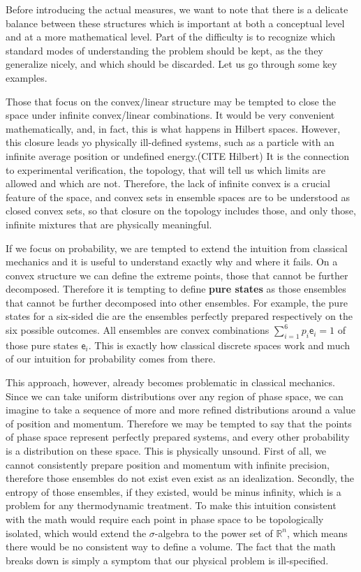 \documentclass[10pt,twocolumn, nofootinbib]{revtex4-2}
\newcommand{\ens}[1][e] {\mathsf{#1}} %
\begin{document}
Before introducing the actual measures, we want to note that there is a delicate balance between these structures which is important at both a conceptual level and at a more mathematical level. Part of the difficulty is to recognize which standard modes of understanding the problem should be kept, as the they generalize nicely, and which should be discarded. Let us go through some key examples.

Those that focus on the convex/linear structure may be tempted to close the space under infinite convex/linear combinations. It would be very convenient mathematically, and, in fact, this is what happens in Hilbert spaces. However, this closure leads yo physically ill-defined systems, such as a particle with an infinite average position or undefined energy.(CITE Hilbert) It is the connection to experimental verification, the topology, that will tell us which limits are allowed and which are not. Therefore, the lack of infinite convex is a crucial feature of the space, and convex sets in ensemble spaces are to be understood as closed convex sets, so that closure on the topology includes those, and only those, infinite mixtures that are physically meaningful.

If we focus on probability, we are tempted to extend the intuition from classical mechanics and it is useful to understand exactly why and where it fails. On a convex structure we can define the extreme points, those that cannot be further decomposed. Therefore it is tempting to define \textbf{pure states} as those ensembles that cannot be further decomposed into other ensembles. For example, the pure states for a six-sided die are the ensembles perfectly prepared respectively on the six possible outcomes. All ensembles are convex combinations $\sum_{i=1}^{6} p_i \ens_i = 1$ of those pure states $\ens_i$. This is exactly how classical discrete spaces work and much of our intuition for probability comes from there.

This approach, however, already becomes problematic in classical mechanics. Since we can take uniform distributions over any region of phase space, we can imagine to take a sequence of more and more refined distributions around a value of position and momentum. Therefore we may be tempted to say that the points of phase space represent perfectly prepared systems, and every other probability is a distribution on these space. This is physically unsound. First of all, we cannot consistently prepare position and momentum with infinite precision, therefore those ensembles do not exist even exist as an idealization. Secondly, the entropy of those ensembles, if they existed, would be minus infinity, which is a problem for any thermodynamic treatment. To make this intuition consistent with the math would require each point in phase space to be topologically isolated, which would extend the $\sigma$-algebra to the power set of $\mathbb{R}^n$, which means there would be no consistent way to define a volume. The fact that the math breaks down is simply a symptom that our physical problem is ill-specified.
\end{document}
